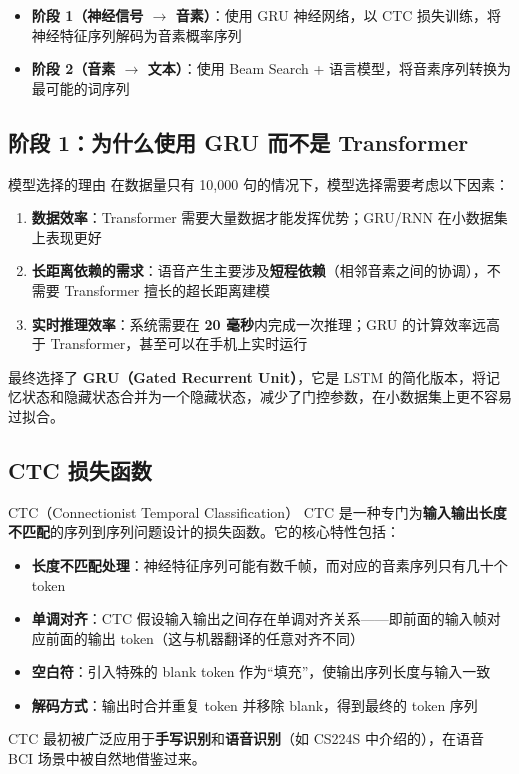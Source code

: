 \begin{itemize}
    \item \textbf{阶段 1（神经信号 $\rightarrow$ 音素）}：使用 GRU 神经网络，以 CTC 损失训练，将神经特征序列解码为音素概率序列
    \item \textbf{阶段 2（音素 $\rightarrow$ 文本）}：使用 Beam Search + 语言模型，将音素序列转换为最可能的词序列
\end{itemize}

\subsection{阶段 1：为什么使用 GRU 而不是 Transformer}

\begin{importantbox}{模型选择的理由}
在数据量只有 10,000 句的情况下，模型选择需要考虑以下因素：
\begin{enumerate}
    \item \textbf{数据效率}：Transformer 需要大量数据才能发挥优势；GRU/RNN 在小数据集上表现更好
    \item \textbf{长距离依赖的需求}：语音产生主要涉及\textbf{短程依赖}（相邻音素之间的协调），不需要 Transformer 擅长的超长距离建模
    \item \textbf{实时推理效率}：系统需要在 \textbf{20 毫秒}内完成一次推理；GRU 的计算效率远高于 Transformer，甚至可以在手机上实时运行
\end{enumerate}
\end{importantbox}

最终选择了 \textbf{GRU（Gated Recurrent Unit）}，它是 LSTM 的简化版本，将记忆状态和隐藏状态合并为一个隐藏状态，减少了门控参数，在小数据集上更不容易过拟合。

\subsection{CTC 损失函数}

\begin{knowledgebox}{CTC（Connectionist Temporal Classification）}
CTC 是一种专门为\textbf{输入输出长度不匹配}的序列到序列问题设计的损失函数。它的核心特性包括：

\begin{itemize}
    \item \textbf{长度不匹配处理}：神经特征序列可能有数千帧，而对应的音素序列只有几十个 token
    \item \textbf{单调对齐}：CTC 假设输入输出之间存在单调对齐关系——即前面的输入帧对应前面的输出 token（这与机器翻译的任意对齐不同）
    \item \textbf{空白符}：引入特殊的 blank token 作为``填充''，使输出序列长度与输入一致
    \item \textbf{解码方式}：输出时合并重复 token 并移除 blank，得到最终的 token 序列
\end{itemize}

CTC 最初被广泛应用于\textbf{手写识别}和\textbf{语音识别}（如 CS224S 中介绍的），在语音 BCI 场景中被自然地借鉴过来。
\end{knowledgebox}

